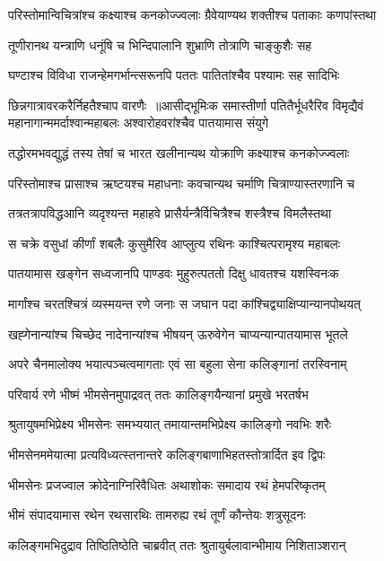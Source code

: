 \twolineshloka
{परिस्तोमान्विचित्रांश्च कक्ष्याश्च कनकोज्ज्वलाः}
{ग्रैवेयाण्यथ शक्तीश्च पताकाः कणपांस्तथा}


\twolineshloka
{तूणीरानथ यन्त्राणि धनूंषि च}
{भिन्दिपालानि शुभ्राणि तोत्राणि चाङ्कुशैः सह}


\twolineshloka
{घण्टाश्च विविधा राजन्हेमगर्भान्त्सरूनपि}
{पततः पातितांश्चैव पश्यामः सह सादिभिः}


छिन्नगात्रावरकरैर्निहतैश्चाप वारणैः ॥आसीद्भूमिःक समास्तीर्णा पतितैर्भूधरैरिव
\twolineshloka
{विमृद्यैवं महानागान्ममर्दाश्वान्महाबलः}
{अश्वारोहवरांश्चैव पातयामास संयुगे}


\twolineshloka
{तद्धोरमभवद्युद्धं तस्य तेषां च भारत}
{खलीनान्यथ योक्राणि कक्ष्याश्च कनकोज्ज्वलाः}


\twolineshloka
{परिस्तोमाश्च प्रासाश्च ऋष्टयश्च महाधनाः}
{कवचान्यथ चर्माणि चित्राण्यास्तरणानि च}


\twolineshloka
{तत्रतत्रापविद्धआनि व्यदृश्यन्त महाहवे}
{प्रासैर्यन्त्रैर्विचित्रैश्च शस्त्रैश्च विमलैस्तथा}


\twolineshloka
{स चक्रे वसुधां कीर्णां शबलैः कुसुमैरिव}
{आप्लुत्य रथिनः काश्चित्परामृश्य महाबलः}


\twolineshloka
{पातयामास खङ्गेन सध्वजानपि पाण्डवः}
{मुहुरुत्पततो दिक्षु धावतश्च यशस्विनःक}


\twolineshloka
{मार्गांश्च चरतश्चित्रं व्यस्मयन्त रणे जनाः}
{स जघान पदा कांश्चिद्व्याक्षिप्यान्यानपोथयत्}


\twolineshloka
{खह्गेनान्यांश्च चिच्छेद नादेनान्यांश्च भीषयन्}
{ऊरुवेगेन चाप्यन्यान्पातयामास भूतले}


\twolineshloka
{अपरे चैनमालोक्य भयात्पञ्चत्वमागताः}
{एवं सा बहुला सेना कलिङ्गानां तरस्विनाम्}


\twolineshloka
{परिवार्य रणे भीष्मं भीमसेनमुपाद्रवत्}
{ततः कालिङ्गयैन्यानां प्रमुखे भरतर्षभ}


\threelineshloka
{श्रुतायुषमभिप्रेक्ष्य भीमसेनः समभ्ययात्}
{तमायान्तमभिप्रेक्ष्य कालिङ्गो नवभिः शरैः}
{}


\twolineshloka
{भीमसेनममेयात्मा प्रत्यविध्यत्स्तनान्तरे}
{कलिङ्गबाणाभिहतस्तोत्रार्दित इव द्विपः}


\twolineshloka
{भीमसेनः प्रजज्वाल क्रोदेनाग्निरिवैधितः}
{अथाशोकः समादाय रथं हेमपरिष्कृतम्}


\twolineshloka
{भीमं संपादयामास रथेन रथसारथिः}
{तामरुह्य रथं तूर्णं कौन्तेयः शत्रुसूदनः}


\twolineshloka
{कलिङ्गमभिदुद्राव तिष्ठितिष्ठेति चाब्रवीत्}
{ततः श्रुतायुर्बलावान्भीमाय निशिताञ्शरान्}


